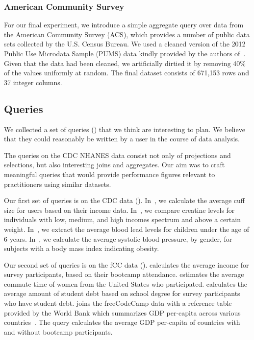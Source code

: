\subsubsection{American Community Survey}
For our final experiment, we introduce a simple aggregate query over data from the American Community Survey (ACS), which
provides a number of public data sets collected by the U.S. Census Bureau.
We used a cleaned version of the 2012 Public Use Microdata Sample (PUMS) data kindly provided by the authors of~\cite{akande2015empirical}.
Given that the data had been cleaned, we artificially dirtied it by removing 40\% of the values uniformly at random.
The final dataset consists of 671,153 rows and 37 integer columns.

\subsection{Queries}
We collected a set of queries () that we think are interesting to plan.
We believe that they could reasonably be written by a user in the course of data analysis.

The queries on the CDC NHANES data consist not only of projections and selections, but also interesting joins and aggregates.
Our aim was to craft meaningful queries
that would provide performance figures relevant to practitioners using
similar datasets.

Our first set of queries is on the CDC data (). In~, we
calculate the average cuff size for users based on their income data. In~, we compare
creatine levels for individuals with low, medium, and high incomes spectrum and above a
certain weight. In~, we extract the average blood lead levels for children under
the age of 6 years. In~, we calculate the average systolic blood pressure, by
gender, for subjects with a body mass index indicating obesity. 

Our second set of queries is on the fCC data ().
 calculates the average income for survey participants, based on their bootcamp attendance.
 estimates the average commute time of women from the United States who participated.
 calculates the average amount of student debt based on school degree for survey participants who have student debt.
 joins the freeCodeCamp data with a reference table provided by the World Bank which summarizes GDP per-capita across various countries~\cite{worldbank-data}.
The query calculates the average GDP per-capita of countries with and without bootcamp participants. 

